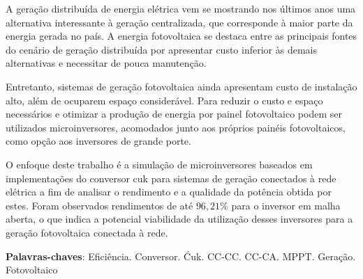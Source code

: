 \documentclass[
	12pt,				%
	openright,			%
	twoside,			%
	a4paper,			%
	english,			%
	french,				%
	spanish,			%
	brazil,				%
	]{abntex2}
\begin{document}


	\setlength{\absparsep}{18pt} %
	\begin{resumo}
	
		A geração distribuída de energia elétrica vem se mostrando nos últimos anos uma alternativa interessante à geração centralizada, que corresponde à maior parte da energia gerada no país. A energia fotovoltaica se destaca entre as principais fontes do cenário de geração distribuída por apresentar custo inferior às demais alternativas e necessitar de pouca manutenção.

		Entretanto, sistemas de geração fotovoltaica ainda apresentam custo de instalação alto, além de ocuparem espaço considerável. Para reduzir o custo e espaço necessários e otimizar a produção de energia por painel fotovoltaico podem ser utilizados microinversores, acomodados junto aos próprios painéis fotovoltaicos, como opção aos inversores de grande porte. 

		O enfoque deste trabalho é a simulação de microinversores baseados em implementações do conversor cuk para sistemas de geração conectados à rede elétrica a fim de analisar o rendimento e a qualidade da potência obtida por estes. Foram observados rendimentos de até $96,21\%$  para o inversor em malha aberta, o que indica a potencial viabilidade da utilização desses inversores para a geração fotovoltaica conectada à rede.

	\vspace{\onelineskip}
	\noindent
	\textbf{Palavras-chaves}: Eficiência. Conversor. Ćuk. CC-CC. CC-CA. MPPT. Geração. Fotovoltaico 
	\end{resumo}
\end{document}
